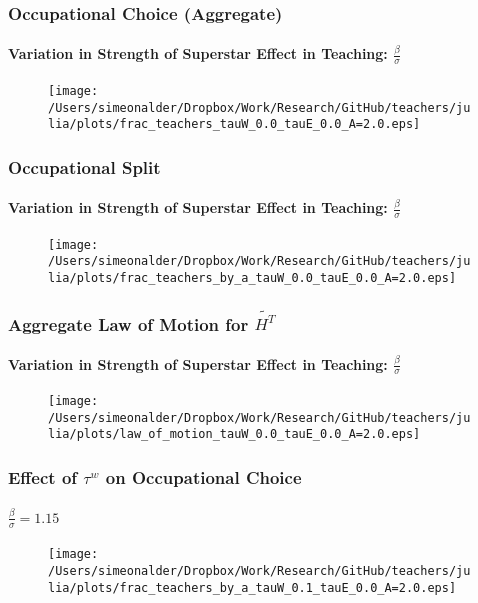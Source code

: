 \documentclass[11pt]{beamer}
\begin{document}
\begin{frame}
\frametitle{Occupational Choice (Aggregate)}
\framesubtitle{Variation in Strength of Superstar Effect in Teaching: $\frac{\beta}{\sigma}$}
\begin{figure}
\begin{center}
\texttt{[image: /Users/simeonalder/Dropbox/Work/Research/GitHub/teachers/julia/plots/frac\_teachers\_tauW\_0.0\_tauE\_0.0\_A=2.0.eps]}
\end{center}
\end{figure}
\end{frame}

\begin{frame}
\frametitle{Occupational Split}
\framesubtitle{Variation in Strength of Superstar Effect in Teaching: $\frac{\beta}{\sigma}$}
\begin{figure}
\begin{center}
\texttt{[image: /Users/simeonalder/Dropbox/Work/Research/GitHub/teachers/julia/plots/frac\_teachers\_by\_a\_tauW\_0.0\_tauE\_0.0\_A=2.0.eps]}
\end{center}
\end{figure}
\end{frame}

\begin{frame}
\frametitle{Aggregate Law of Motion for $\widetilde{H^T}$}
\framesubtitle{Variation in Strength of Superstar Effect in Teaching: $\frac{\beta}{\sigma}$}
\begin{figure}
\begin{center}
\texttt{[image: /Users/simeonalder/Dropbox/Work/Research/GitHub/teachers/julia/plots/law\_of\_motion\_tauW\_0.0\_tauE\_0.0\_A=2.0.eps]}
\end{center}
\end{figure}
\end{frame}

\begin{frame}
\frametitle{Effect of $\tau^w$ on Occupational Choice}
\framesubtitle{$\frac{\beta}{\sigma} = 1.15$}
\begin{figure}
\begin{center}
\texttt{[image: /Users/simeonalder/Dropbox/Work/Research/GitHub/teachers/julia/plots/frac\_teachers\_by\_a\_tauW\_0.1\_tauE\_0.0\_A=2.0.eps]}
\end{center}
\end{figure}
\end{frame}
\end{document}
